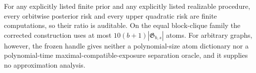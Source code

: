 For any explicitly listed finite prior and any explicitly listed realizable procedure, every orbitwise posterior risk and every upper quadratic risk are finite computations, so their ratio is auditable.  On the equal block-clique family the corrected construction uses at most \(10(b+1)|\mathfrak G_{b,s}|\) atoms.  For arbitrary graphs, however, the frozen handle gives neither a polynomial-size atom dictionary nor a polynomial-time maximal-compatible-exposure separation oracle, and it supplies no approximation analysis.